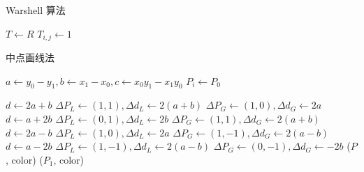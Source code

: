 \documentclass[a4paper]{article}
\begin{document}
\begin{algorithm}
    \caption{Warshell 算法}

    \BlankLine

    $T \leftarrow R$\;
    {
        {
            {
                {
                    $T_{i,j} \leftarrow 1$
                }
            }
        }
    }
\end{algorithm}

\begin{algorithm}
    \caption{中点画线法}

    \BlankLine

    $a\leftarrow y_0-y_1, b\leftarrow x_1-x_0, c\leftarrow x_0y_1-x_1y_0$\;
    $P_i\leftarrow P_0$\;

    {
        $d\leftarrow 2a+b$\;
        $\Delta P_L \leftarrow (1,1), \Delta d_L \leftarrow 2(a+b)$\;
        $\Delta P_G \leftarrow (1,0), \Delta d_G \leftarrow 2a$\;
    }
    {
        $d\leftarrow a+2b$\;
        $\Delta P_L \leftarrow (0,1), \Delta d_L \leftarrow 2b$\;
        $\Delta P_G \leftarrow (1,1), \Delta d_G \leftarrow 2(a+b)$\;
    }
    \uElseIf{$k\in[-1,0)$}
    {
    $d\leftarrow 2a-b$\;
    $\Delta P_L \leftarrow (1,0), \Delta d_L \leftarrow 2a$\;
    $\Delta P_G \leftarrow (1,-1), \Delta d_G \leftarrow 2(a-b)$\;
    }
    \Else
    {
        $d\leftarrow a-2b$\;
        $\Delta P_L \leftarrow (1,-1), \Delta d_L \leftarrow 2(a-b)$\;
        $\Delta P_G \leftarrow (0,-1), \Delta d_G \leftarrow -2b$\;
    }
    {
        \putpixel($P$, color)\;
    }
    \putpixel($P_1$, color)\;
\end{algorithm}
\end{document}
